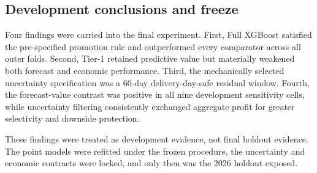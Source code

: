 \subsection{Development conclusions and freeze}

Four findings were carried into the final experiment. First, Full XGBoost satisfied the pre-specified promotion rule and outperformed every comparator across all outer folds. Second, Tier-1 retained predictive value but materially weakened both forecast and economic performance. Third, the mechanically selected uncertainty specification was a 60-day delivery-day-safe residual window. Fourth, the forecast-value contrast was positive in all nine development sensitivity cells, while uncertainty filtering consistently exchanged aggregate profit for greater selectivity and downside protection.

These findings were treated as development evidence, not final holdout evidence. The point models were refitted under the frozen procedure, the uncertainty and economic contracts were locked, and only then was the 2026 holdout exposed.
